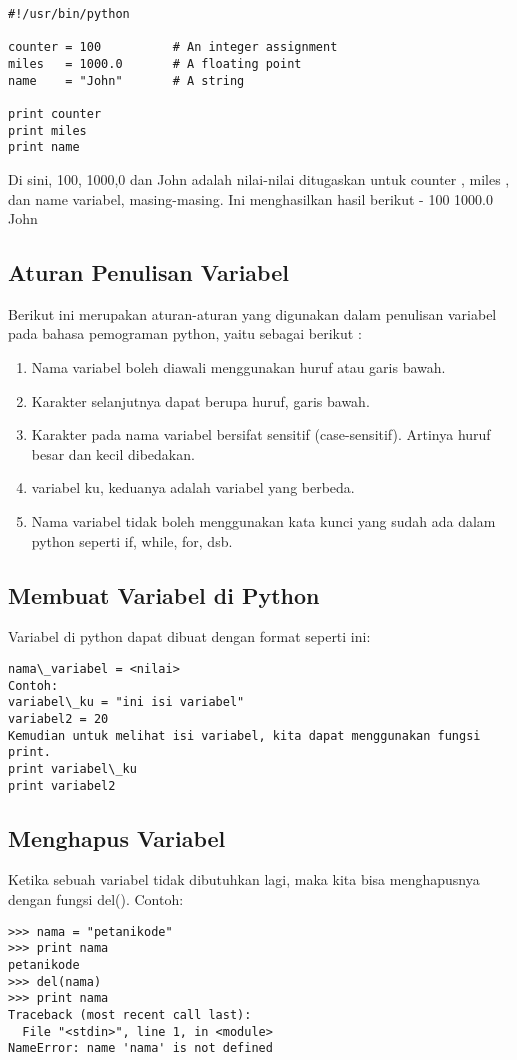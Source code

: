 \documentclass[12pt]{article}
\begin{document}
\begin{verbatim}
#!/usr/bin/python

counter = 100          # An integer assignment
miles   = 1000.0       # A floating point
name    = "John"       # A string

print counter
print miles
print name
\end{verbatim}

Di sini, 100, 1000,0 dan John adalah nilai-nilai ditugaskan untuk counter , miles , dan name variabel, masing-masing. Ini menghasilkan hasil berikut -
100
1000.0
John

\subsection{Aturan Penulisan Variabel}
Berikut ini merupakan aturan-aturan yang digunakan dalam penulisan variabel pada bahasa pemograman python, yaitu sebagai berikut :
\begin{enumerate}
	\item Nama variabel boleh diawali menggunakan huruf atau garis bawah.
	\item Karakter selanjutnya dapat berupa huruf, garis bawah.
	\item Karakter pada nama variabel bersifat sensitif (case-sensitif). Artinya huruf besar dan kecil dibedakan. 
	\item variabel ku, keduanya adalah variabel yang berbeda.
	\item Nama variabel tidak boleh menggunakan kata kunci yang sudah ada dalam python seperti if, while, for, dsb.
\end{enumerate}  

\subsection{Membuat Variabel di Python}
Variabel di python dapat dibuat dengan format seperti ini:

\begin{verbatim}
nama\_variabel = <nilai>
Contoh:
variabel\_ku = "ini isi variabel"
variabel2 = 20
Kemudian untuk melihat isi variabel, kita dapat menggunakan fungsi print.
print variabel\_ku
print variabel2
\end{verbatim}

\subsection{Menghapus Variabel}
Ketika sebuah variabel tidak dibutuhkan lagi, maka kita bisa menghapusnya dengan fungsi del().
Contoh:
\begin{verbatim}
>>> nama = "petanikode"
>>> print nama
petanikode
>>> del(nama)
>>> print nama
Traceback (most recent call last):
  File "<stdin>", line 1, in <module>
NameError: name 'nama' is not defined
\end{verbatim}
\end{document}
